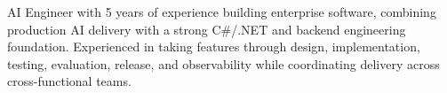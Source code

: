 

\begin{cvparagraph}

AI Engineer with 5 years of experience building enterprise software, combining production AI delivery with a strong C\#/.NET and backend engineering foundation.
Experienced in taking features through design, implementation, testing, evaluation, release, and observability while coordinating delivery across cross-functional teams.
\end{cvparagraph}
